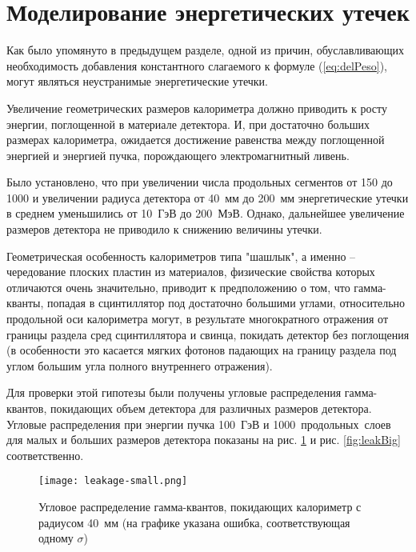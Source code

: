 \newpage  
\section{Моделирование энергетических утечек}  \label{chap6}  

Как было упомянуто в предыдущем разделе, одной из причин, обуславливающих необходимость добавления константного слагаемого к формуле (\ref{eq:delPeso}), могут являться неустранимые энергетические утечки. 

Увеличение геометрических размеров калориметра должно приводить к росту энергии, поглощенной в материале детектора. И, при достаточно больших размерах калориметра, ожидается достижение равенства между поглощенной энергией и энергией пучка, порождающего электромагнитный ливень. 

Было установлено, что при увеличении числа продольных сегментов от 150 до 1000 и увеличении радиуса детектора от \mbox{40 мм} до \mbox{200 мм} энергетические утечки в среднем уменьшились от \mbox{10 ГэВ} до \mbox{200 МэВ}. Однако, дальнейшее увеличение размеров детектора не приводило к снижению величины утечки. 

Геометрическая особенность калориметров типа "шашлык"{}, а именно -- чередование плоских пластин из материалов, физические свойства которых отличаются очень значительно, приводит к предположению о том, что гамма-кванты, попадая в сцинтиллятор под достаточно большими углами, относительно продольной оси калориметра могут, в результате многократного отражения от границы раздела сред сцинтиллятора и свинца, покидать детектор без поглощения (в особенности это касается мягких фотонов падающих на границу раздела под углом большим угла полного внутреннего отражения). 

Для проверки этой гипотезы были получены угловые распределения гамма-квантов, покидающих объем детектора для различных размеров детектора. Угловые распределения при энергии пучка \mbox{100 ГэВ} и \mbox{1000 продольных слоев} для малых и больших размеров детектора показаны на рис. \ref{fig:leakSmall}  и рис. \ref{fig:leakBig} соответственно.

\begin{figure}[H]
    \centering
    \texttt{[image: leakage-small.png]}
    \caption{Угловое распределение гамма-квантов, покидающих калориметр с радиусом \mbox{40 мм} (на графике указана ошибка, соответствующая одному $\sigma$)}
    \label{fig:leakSmall}
\end{figure}

